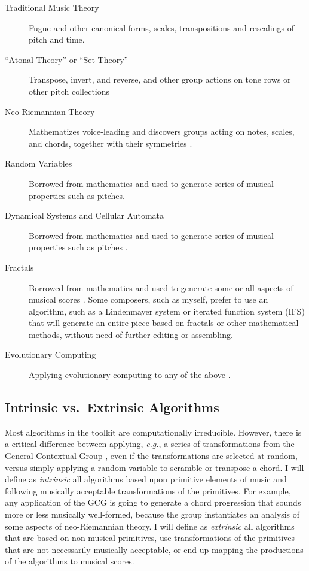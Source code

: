 \documentclass[11pt,papersize=a4]{scrartcl}
\begin{document}
\begin{description}
\item[Traditional Music Theory] Fugue and other canonical forms, scales, transpositions and rescalings of pitch and time.
\item[``Atonal Theory'' or ``Set Theory''] Transpose, invert, and reverse, and other group actions on tone rows or other pitch collections \parencite{rahn1991basic}
\item[Neo-Riemannian Theory] Mathematizes voice-leading and discovers groups acting on notes, scales, and chords, together with their symmetries \parencite{geometryofchords, tymoczko2006geometry, callender2008generalized}.
\item[Random Variables] Borrowed from mathematics and used to generate series of musical properties such as pitches.
\item[Dynamical Systems and Cellular Automata] Borrowed from mathematics and used to generate series of musical properties such as pitches \parencite{Miranda1993}.
\item[Fractals] Borrowed from mathematics and used to generate some or all aspects of musical scores \parencite{miranda2001composing, madden2007fractals}. Some composers, such as myself, prefer to use an algorithm, such as a Lindenmayer system \parencite{algorithmicbeautyofplants, prusinkiewicz1986sgs,  fractalmusicwithstringrewritinggrammars} or iterated function system (IFS) \parencite{fractalseverywhere, ifsmusic} that will generate an entire piece based on fractals or other mathematical methods, without need of further editing or assembling. 
\item[Evolutionary Computing] Applying evolutionary computing to any of the above \parencite{miranda2007evolutionary}.
\end{description}

\subsection*{Intrinsic vs.\ Extrinsic Algorithms}

Most algorithms in the toolkit are computationally irreducible. However, there is a critical difference between applying, \emph{e.g.}, a series of transformations from the General Contextual Group \parencite{fiore2005gcg}, even if the transformations are selected at random, versus simply applying a random variable to scramble or transpose a chord. I will define as \emph{intrinsic} all algorithms based upon primitive elements of music and following musically acceptable transformations of the primitives. For example, any application of the GCG is going to generate a chord progression that sounds more or less musically well-formed, because the group instantiates an analysis of some aspects of neo-Riemannian theory. I will define as \emph{extrinsic} all algorithms that are based on non-musical primitives, use transformations of the primitives that are not necessarily musically acceptable, or end up mapping the productions of the algorithms to musical scores.
\end{document}
